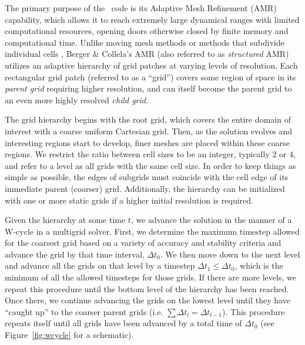The primary purpose of the \enzo\ code is its Adaptive Mesh Refinement
(AMR) capability, which allows it to reach extremely large dynamical
ranges with limited computational resources, opening doors otherwise
closed by finite memory and computational time. Unlike moving mesh
methods \citep{1995ApJS..100..269P,1995ApJS...97..231G} or methods
that subdivide individual cells \citep{Adjerid}, Berger \& Collela's
AMR (also referred to as \emph{structured} AMR) utilizes an adaptive
hierarchy of grid patches at varying levels of resolution.  Each
rectangular grid patch (referred to as a ``grid'') covers some region
of space in its \emph{parent grid} requiring higher resolution,
and can itself become the parent grid to an even more highly resolved
\emph{child grid}.

The grid hierarchy begins with the root grid, which covers the entire
domain of interest with a coarse uniform Cartesian grid. Then, as
the solution evolves and interesting regions start to develop, finer meshes are
placed within these coarse regions.
We restrict the ratio between cell sizes to be an integer, typically 2
or 4, and refer to a level as all grids with the same cell size.  In
order to keep things as simple as possible, the edges of subgrids must
coincide with the cell edge of its immediate parent (coarser)
grid. Additionally, the hierarchy can be initialized with one or more
static grids if a higher initial resolution is required.

Given the hierarchy at some time $t$, we advance the solution in the
manner of a W-cycle in a multigrid solver.  First, we determine the
maximum timestep allowed for the coarsest grid based on a variety of
accuracy and stability criteria and advance the grid by that time
interval, $\Delta t_0$.  We then move down to the next level and
advance all the grids on that level by a timestep $\Delta t_1 \leq
\Delta t_0$, which is the minimum of all the allowed timesteps for
those grids.  If there are more levels, we repeat this procedure until
the bottom level of the hierarchy has been reached.  Once there, we
continue advancing the grids on the lowest level until they have
``caught up'' to the coarser parent grids (i.e. $\sum \Delta t_l =
\Delta t_{l-1}$).  This procedure repeats itself until all grids have
been advanced by a total time of $\Delta t_0$ (see
Figure~\ref{fig:wcycle} for a schematic).


